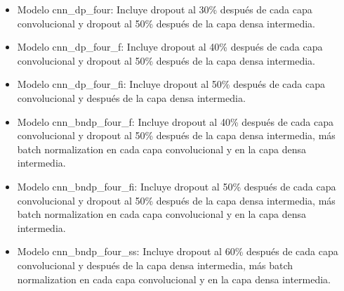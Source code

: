 \begin{itemize}

\item Modelo cnn\_dp\_four: Incluye dropout al 30\% después de cada capa convolucional y dropout al 50\% después de la capa densa intermedia.

\item Modelo cnn\_dp\_four\_f: Incluye dropout al 40\% después de cada capa convolucional y dropout al 50\% después de la capa densa intermedia.

\item Modelo cnn\_dp\_four\_fi: Incluye dropout al 50\% después de cada capa convolucional y después de la capa densa intermedia.

\item Modelo cnn\_bndp\_four\_f: Incluye dropout al 40\% después de cada capa convolucional y dropout al 50\% después de la capa densa intermedia, más batch normalization en cada capa convolucional y en la capa densa intermedia.

\item Modelo cnn\_bndp\_four\_fi: Incluye dropout al 50\% después de cada capa convolucional y dropout al 50\% después de la capa densa intermedia, más batch normalization en cada capa convolucional y en la capa densa intermedia.

\item Modelo cnn\_bndp\_four\_ss: Incluye dropout al 60\% después de cada capa convolucional y después de la capa densa intermedia, más batch normalization en cada capa convolucional y en la capa densa intermedia.

\end{itemize}
